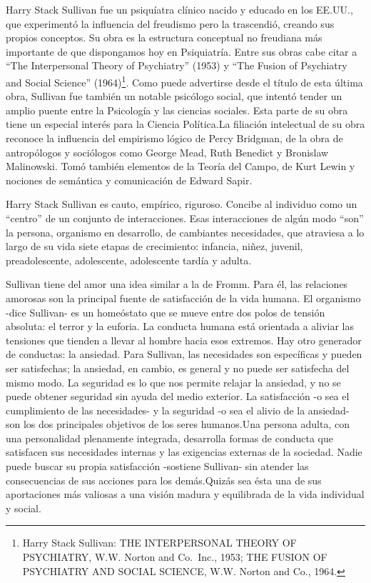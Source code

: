 \documentclass[
]{book}
\begin{document}
Harry Stack Sullivan fue un psiquíatra clínico nacido y educado en los EE.UU., que experimentó la influencia del freudismo pero la trascendió, creando sus propios conceptos. Su obra es la estructura conceptual no freudiana más importante de que dispongamos hoy en Psiquiatría. Entre sus obras cabe citar a ``The Interpersonal Theory of Psychiatry'' (1953) y ``The Fusion of Psychiatry and Social Science'' (1964)\footnote{Harry Stack Sullivan: THE INTERPERSONAL THEORY OF PSYCHIATRY, W.W. Norton and Co.~Inc., 1953; THE FUSION OF PSYCHIATRY AND SOCIAL SCIENCE, W.W. Norton and Co., 1964.}. Como puede advertirse desde el título de esta última obra, Sullivan fue también un notable psicólogo social, que intentó tender un amplio puente entre la Psicología y las ciencias sociales. Esta parte de su obra tiene un especial interés para la Ciencia Política.La filiación intelectual de su obra reconoce la influencia del empirismo lógico de Percy Bridgman, de la obra de antropólogos y sociólogos como George Mead, Ruth Benedict y Bronislaw Malinowski. Tomó también elementos de la Teoría del Campo, de Kurt Lewin y nociones de semántica y comunicación de Edward Sapir.

Harry Stack Sullivan es cauto, empírico, riguroso. Concibe al individuo como un ``centro'' de un conjunto de interacciones. Esas interacciones de algún modo ``son'' la persona, organismo en desarrollo, de cambiantes necesidades, que atraviesa a lo largo de su vida siete etapas de crecimiento: infancia, niñez, juvenil, preadolescente, adolescente, adolescente tardía y adulta.

Sullivan tiene del amor una idea similar a la de Fromm. Para él, las relaciones amorosas son la principal fuente de satisfacción de la vida humana. El organismo -dice Sullivan- es un homeóstato que se mueve entre dos polos de tensión absoluta: el terror y la euforia. La conducta humana está orientada a aliviar las tensiones que tienden a llevar al hombre hacia esos extremos. Hay otro generador de conductas: la ansiedad. Para Sullivan, las necesidades son específicas y pueden ser satisfechas; la ansiedad, en cambio, es general y no puede ser satisfecha del mismo modo. La seguridad es lo que nos permite relajar la ansiedad, y no se puede obtener seguridad sin ayuda del medio exterior. La satisfacción -o sea el cumplimiento de las necesidades- y la seguridad -o sea el alivio de la ansiedad- son los dos principales objetivos de los seres humanos.Una persona adulta, con una personalidad plenamente integrada, desarrolla formas de conducta que satisfacen sus necesidades internas y las exigencias externas de la sociedad. Nadie puede buscar su propia satisfacción -sostiene Sullivan- sin atender las consecuencias de sus acciones para los demás.Quizás sea ésta una de sus aportaciones más valiosas a una visión madura y equilibrada de la vida individual y social.
\end{document}
